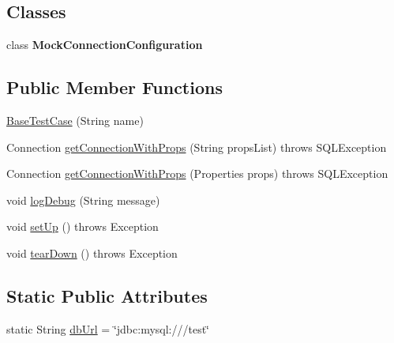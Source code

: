 \subsection*{Classes}
\begin{DoxyCompactItemize}
\item 
class {\bfseries Mock\+Connection\+Configuration}
\end{DoxyCompactItemize}
\subsection*{Public Member Functions}
\begin{DoxyCompactItemize}
\item 
\mbox{\hyperlink{classtestsuite_1_1_base_test_case_a353e63229f72905eb043169b6c2002b5}{Base\+Test\+Case}} (String name)
\item 
Connection \mbox{\hyperlink{classtestsuite_1_1_base_test_case_a7a043249373f91474cb8dbfad42ea105}{get\+Connection\+With\+Props}} (String props\+List)  throws S\+Q\+L\+Exception 
\item 
Connection \mbox{\hyperlink{classtestsuite_1_1_base_test_case_a694c26abcb73b73849f9d10ffdc4ebae}{get\+Connection\+With\+Props}} (Properties props)  throws S\+Q\+L\+Exception 
\item 
void \mbox{\hyperlink{classtestsuite_1_1_base_test_case_ad4d75cf77ae765c312cda0d97c610a21}{log\+Debug}} (String message)
\item 
void \mbox{\hyperlink{classtestsuite_1_1_base_test_case_a195f5d285c7979328734606d08ad15b1}{set\+Up}} ()  throws Exception 
\item 
void \mbox{\hyperlink{classtestsuite_1_1_base_test_case_a51c7d76ab24b0c966f956250fd7a4f52}{tear\+Down}} ()  throws Exception 
\end{DoxyCompactItemize}
\subsection*{Static Public Attributes}
\begin{DoxyCompactItemize}
\item 
static String \mbox{\hyperlink{classtestsuite_1_1_base_test_case_abf615dd75e2b0bff6538d49bcc34541c}{db\+Url}} = \char`\"{}jdbc\+:mysql\+:///test\char`\"{}
\end{DoxyCompactItemize}
